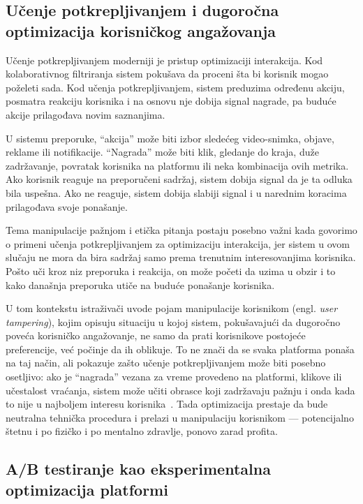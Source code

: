 \subsection{Učenje potkrepljivanjem i dugoročna optimizacija korisničkog angažovanja}

Učenje potkrepljivanjem moderniji je pristup optimizaciji interakcija. Kod kolaborativnog filtriranja sistem pokušava da proceni šta bi korisnik mogao poželeti sada. Kod učenja potkrepljivanjem, sistem preduzima određenu akciju, posmatra reakciju korisnika i na osnovu nje dobija signal nagrade, pa buduće akcije prilagođava novim saznanjima.

U sistemu preporuke, “akcija” može biti izbor sledećeg video-snimka, objave, reklame ili notifikacije. “Nagrada” može biti klik, gledanje do kraja, duže zadržavanje, povratak korisnika na platformu ili neka kombinacija ovih metrika. Ako korisnik reaguje na preporučeni sadržaj, sistem dobija signal da je ta odluka bila uspešna. Ako ne reaguje, sistem dobija slabiji signal i u narednim koracima prilagođava svoje ponašanje.

Tema manipulacije pažnjom i etička pitanja postaju posebno važni kada govorimo o primeni učenja potkrepljivanjem za optimizaciju interakcija, jer sistem u ovom slučaju ne mora da bira sadržaj samo prema trenutnim interesovanjima korisnika. Pošto uči kroz niz preporuka i reakcija, on može početi da uzima u obzir i to kako današnja preporuka utiče na buduće ponašanje korisnika.

U tom kontekstu istraživači uvode pojam manipulacije korisnikom (engl. \textit{user tampering}), kojim opisuju situaciju u kojoj sistem, pokušavajući da dugoročno poveća korisničko angažovanje, ne samo da prati korisnikove postojeće preferencije, već počinje da ih oblikuje. To ne znači da se svaka platforma ponaša na taj način, ali pokazuje zašto učenje potkrepljivanjem može biti posebno osetljivo: ako je “nagrada” vezana za vreme provedeno na platformi, klikove ili učestalost vraćanja, sistem može učiti obrasce koji zadržavaju pažnju i onda kada to nije u najboljem interesu korisnika~\cite{kasirzadeh2021user}. Tada optimizacija prestaje da bude neutralna tehnička procedura i prelazi u manipulaciju korisnikom — potencijalno štetnu i po fizičko i po mentalno zdravlje, ponovo zarad profita.

\subsection{A/B testiranje kao eksperimentalna optimizacija platformi}

